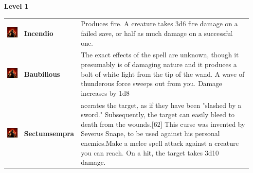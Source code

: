 \textbf{Level 1} 
\begin{tabular}{ m{4cm}m{3cm}m{6cm} } 
	\includegraphics[width=4cm]{../Pictures/Gameplay/Spells/Icon/spell_icon.png} & \textbf{Incendio} & Produces fire. A creature takes 3d6 fire damage on a failed save, or half as much damage on a successful one.  \\ 
\includegraphics[width=4cm]{../Pictures/Gameplay/Spells/Icon/spell_icon.png} & \textbf{Baubillous} & The exact effects of the spell are unknown, though it presumably is of damaging nature and it produces a bolt of white light from the tip of the wand. A wave of thunderous force sweeps out from you. Damage increases by 1d8\\
 \includegraphics[width=4cm]{../Pictures/Gameplay/Spells/Icon/spell_icon.png} & \textbf{Sectumsempra} & acerates the target, as if they have been "slashed by a sword." Subsequently, the target can easily bleed to death from the wounds.[62] This curse was invented by Severus Snape, to be used against his personal enemies.Make a melee spell attack against a creature you can reach. On a hit, the target takes 3d10 damage. \\
\end{tabular}

